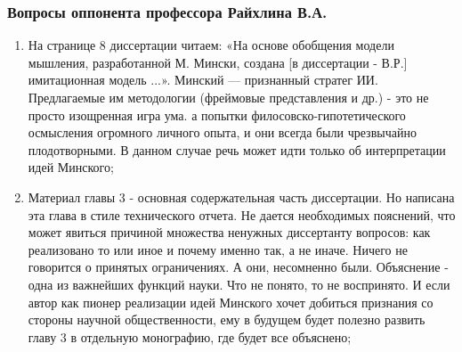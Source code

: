 \documentclass[14pt]{beamer}
\begin{document}
\begin{frame}
\frametitle{Вопросы оппонента профессора Райхлина В.А.}
\begin{enumerate}
\scriptsize 
 

   \item На странице 8 диссертации читаем: «На основе обобщения модели мышления, разработанной М. Мински, создана [в диссертации - В.Р.] имитационная модель ...». Минский — признанный стратег ИИ. Предлагаемые им методологии (фреймовые представления и др.) - это не просто изощренная игра ума. а попытки филосовско-гипотетического осмысления огромного личного опыта, и они всегда были чрезвычайно плодотворными. В данном случае речь может идти только об интерпретации идей Минского;

\item Материал главы 3 - основная содержательная часть диссертации. Но написана эта глава в стиле технического отчета. Не дается необходимых пояснений, что может явиться причиной множества ненужных диссертанту вопросов: как реализовано то или иное и почему именно так, а не иначе. Ничего не говорится о принятых ограничениях. А они, несомненно были. Объяснение - одна из важнейших функций науки. Что не понято, то не воспринято. И если автор как пионер реализации идей Минского хочет добиться признания со стороны научной общественности, ему в будущем будет полезно развить главу 3 в отдельную монографию, где будет все объяснено;
\end{enumerate}
\end{frame}
\end{document}
